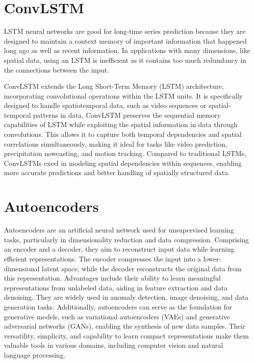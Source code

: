 \section{ConvLSTM}
\label{sec:ConvLSTM} 

LSTM neural networks are good for long-time series prediction because they are designed to maintain a context memory of important information that happened long ago as well as recent information. In applications with many dimensions, like spatial data, using an LSTM is inefficient as it contains too much redundancy in the connections between the input. 

ConvLSTM extends the Long Short-Term Memory (LSTM) architecture, incorporating convolutional operations within the LSTM units. It is specifically designed to handle spatiotemporal data, such as video sequences or spatial-temporal patterns in data. ConvLSTM preserves the sequential memory capabilities of LSTM while exploiting the spatial information in data through convolutions. This allows it to capture both temporal dependencies and spatial correlations simultaneously, making it ideal for tasks like video prediction, precipitation nowcasting, and motion tracking. Compared to traditional LSTMs, ConvLSTMs excel in modeling spatial dependencies within sequences, enabling more accurate predictions and better handling of spatially structured data.

\section{Autoencoders}
\label{sec:Autoencoders} 

Autoencoders are an artificial neural network used for unsupervised learning tasks, particularly in dimensionality reduction and data compression. Comprising an encoder and a decoder, they aim to reconstruct input data while learning efficient representations. The encoder compresses the input into a lower-dimensional latent space, while the decoder reconstructs the original data from this representation. Advantages include their ability to learn meaningful representations from unlabeled data, aiding in feature extraction and data denoising. They are widely used in anomaly detection, image denoising, and data generation tasks. Additionally, autoencoders can serve as the foundation for generative models, such as variational autoencoders (VAEs) and generative adversarial networks (GANs), enabling the synthesis of new data samples. Their versatility, simplicity, and capability to learn compact representations make them valuable tools in various domains, including computer vision and natural language processing.

